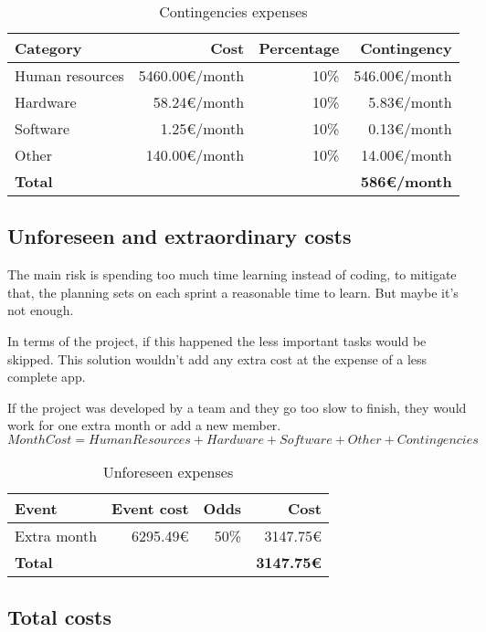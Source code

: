 \begin{table}[h!]
\centering
\begin{tabular}{lrrr}
    \toprule
    \textbf{Category} & \textbf{Cost} & \textbf{Percentage} & \textbf{Contingency} \\
    \midrule
    Human resources & 5460.00€/month & 10\% & 546.00€/month \\
    Hardware & 58.24€/month & 10\% & 5.83€/month \\
    Software & 1.25€/month & 10\% & 0.13€/month \\
    Other & 140.00€/month & 10\% & 14.00€/month \\
    \midrule
    \textbf{Total} & & & \textbf{586€/month} \\
    \bottomrule
\end{tabular}
\caption{Contingencies expenses}
\label{contingency-costs-table}
\end{table}
\subsection{Unforeseen and extraordinary costs}

The main risk is spending too much time learning instead of coding, to mitigate that, the planning sets on each sprint a reasonable time to learn. But maybe it's not enough.

In terms of the project, if this happened the less important tasks would be skipped. This solution wouldn't add any extra cost at the expense of a less complete app.

If the project was developed by a team and they go too slow to finish, they would work for one extra month or add a new member.
\[MonthCost=HumanResources+Hardware+Software+Other+Contingencies\]
\begin{table}[h!]
\centering
\begin{tabular}{lrrr}
    \toprule
    \textbf{Event} & \textbf{Event cost} & \textbf{Odds} & \textbf{Cost} \\
    \midrule
    Extra month & 6295.49€ & 50\% & 3147.75€ \\
    \midrule
    \textbf{Total} & & & \textbf{3147.75€} \\
    \bottomrule
\end{tabular}
\caption{Unforeseen expenses}
\label{extra-costs-table}
\end{table}

\newpage
\subsection{Total costs}

